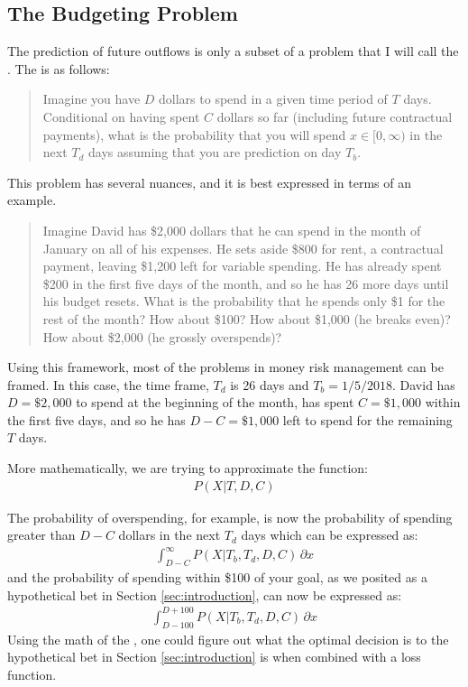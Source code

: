\documentclass[11pt,a4paper]{article}
\begin{document}
\subsection{The Budgeting Problem}
The prediction of future outflows is only a subset of a problem that I will call the \budgetprob. The \budgetprob is as follows:
\begin{quote}
	Imagine you have $D$ dollars to spend in a given time period of $T$ days. Conditional on having spent $C$ dollars so far (including future contractual payments), what is the probability that you will spend $x \in [0,\infty)$ in the next $T_d$ days assuming that you are prediction on day $T_b$.  
\end{quote}
This problem has several nuances, and it is best expressed in terms of an example. 
\begin{quote}
	Imagine David has \$2,000 dollars that he can spend in the month of January on all of his expenses. He sets aside \$800 for rent, a contractual payment, leaving \$1,200 left for variable spending. He has already spent \$200 in the first five days of the month, and so he has 26 more days until his budget resets. What is the probability that he spends only \$1 for the rest of the month? How about \$100? How about \$1,000 (he breaks even)? How about \$2,000 (he grossly overspends)?
\end{quote}

Using this framework, most of the problems in money risk management can be framed. In this case, the time frame, $T_d$ is 26 days and $T_b = 1/5/2018$. David has $D = \$2,000$ to spend at the beginning of the month, has spent $C = \$1,000$ within the first five days, and so he has $D - C = \$1,000$ left to spend for the remaining $T$ days. 

More mathematically, we are trying to approximate the function:
\begin{align*}
P(X | T, D, C)
\end{align*} 

The probability of overspending, for example, is now the probability of spending greater than $D - C$ dollars in the next $T_d$ days which can be expressed as:
\begin{align*}
\int_{D-C}^{\infty} P(X | T_b, T_d, D, C) \,\partial x
\end{align*}
and the probability of spending within \$100 of your goal, as we posited as a hypothetical bet in Section \ref{sec:introduction}, can now be expressed as: 
\begin{align*}
\int_{D - 100}^{D + 100} P(X | T_b, T_d, D, C) \,\partial x
\end{align*}
Using the math of the \budgetprob, one could figure out what the optimal decision is to the hypothetical bet in Section \ref{sec:introduction} is when combined with a loss function. 
\end{document}
